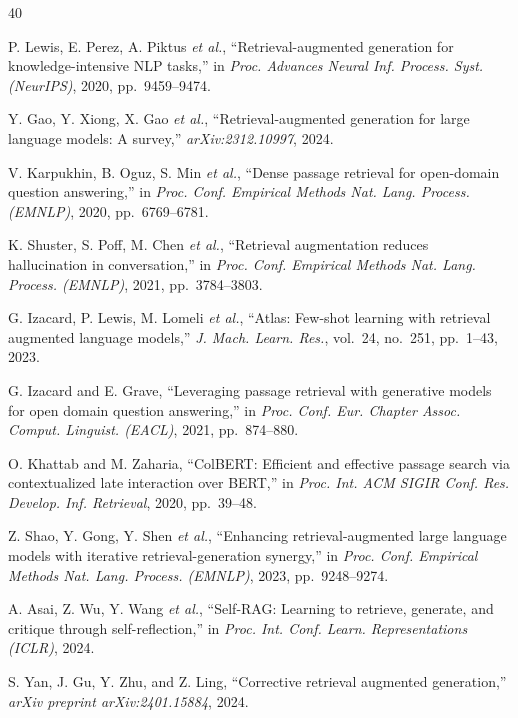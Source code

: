 \documentclass[journal,10pt]{IEEEtran}
\begin{document}
\begin{thebibliography}{40}

 P. Lewis, E. Perez, A. Piktus \emph{et al.}, ``Retrieval-augmented generation for knowledge-intensive NLP tasks,'' in \emph{Proc. Advances Neural Inf. Process. Syst. (NeurIPS)}, 2020, pp.\ 9459--9474.

 Y. Gao, Y. Xiong, X. Gao \emph{et al.}, ``Retrieval-augmented generation for large language models: A survey,'' \emph{arXiv:2312.10997}, 2024.

 V. Karpukhin, B. Oguz, S. Min \emph{et al.}, ``Dense passage retrieval for open-domain question answering,'' in \emph{Proc. Conf. Empirical Methods Nat. Lang. Process. (EMNLP)}, 2020, pp.\ 6769--6781.

 K. Shuster, S. Poff, M. Chen \emph{et al.}, ``Retrieval augmentation reduces hallucination in conversation,'' in \emph{Proc. Conf. Empirical Methods Nat. Lang. Process. (EMNLP)}, 2021, pp.\ 3784--3803.

 G. Izacard, P. Lewis, M. Lomeli \emph{et al.}, ``Atlas: Few-shot learning with retrieval augmented language models,'' \emph{J. Mach. Learn. Res.}, vol.~24, no.~251, pp.\ 1--43, 2023.

 G. Izacard and E. Grave, ``Leveraging passage retrieval with generative models for open domain question answering,'' in \emph{Proc. Conf. Eur. Chapter Assoc. Comput. Linguist. (EACL)}, 2021, pp.\ 874--880.

 O. Khattab and M. Zaharia, ``ColBERT: Efficient and effective passage search via contextualized late interaction over BERT,'' in \emph{Proc. Int. ACM SIGIR Conf. Res. Develop. Inf. Retrieval}, 2020, pp.\ 39--48.

 Z. Shao, Y. Gong, Y. Shen \emph{et al.}, ``Enhancing retrieval-augmented large language models with iterative retrieval-generation synergy,'' in \emph{Proc. Conf. Empirical Methods Nat. Lang. Process. (EMNLP)}, 2023, pp.\ 9248--9274.

 A. Asai, Z. Wu, Y. Wang \emph{et al.}, ``Self-RAG: Learning to retrieve, generate, and critique through self-reflection,'' in \emph{Proc. Int. Conf. Learn. Representations (ICLR)}, 2024.

 S. Yan, J. Gu, Y. Zhu, and Z. Ling, ``Corrective retrieval augmented generation,'' \emph{arXiv preprint arXiv:2401.15884}, 2024.


\end{thebibliography}
\end{document}
